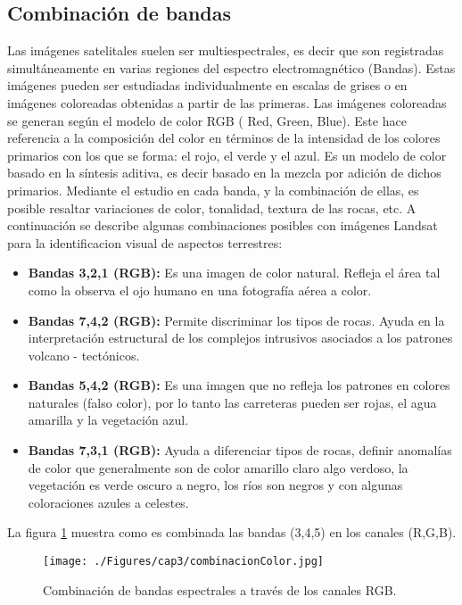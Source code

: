 \subsection{Combinaci\'on de bandas}
Las im\'agenes satelitales suelen ser multiespectrales, es decir que son registradas simult\'aneamente en varias regiones del espectro electromagn\'etico (Bandas). Estas im\'agenes pueden ser estudiadas individualmente en escalas de grises o en im\'agenes coloreadas obtenidas a partir de las primeras. Las im\'agenes coloreadas se generan seg\'un el modelo de color RGB ( Red, Green, Blue). Este hace referencia a la composici\'on del color en t\'erminos de la intensidad de los colores primarios con los que se forma: el rojo, el verde y el azul. Es un modelo de color basado en la s\'intesis aditiva, es decir basado en la mezcla por adici\'on de dichos primarios\cite{teledet2015Combi}.
Mediante el estudio en cada banda, y la combinaci\'on de ellas, es posible resaltar variaciones de color, tonalidad, textura de las rocas, etc. A continuaci\'on se describe algunas combinaciones posibles con im\'agenes Landsat para la identificacion visual de aspectos terrestres\cite{lillesand2014remote}:
	\begin{itemize}
		\item \textbf{Bandas 3,2,1 (RGB):} Es una imagen de color natural. Refleja el \'area tal como la observa el ojo humano en una fotograf\'ia a\'erea a color.
		\item  \textbf{Bandas 7,4,2 (RGB):} Permite discriminar los tipos de rocas. Ayuda en la interpretaci\'on estructural de los complejos intrusivos asociados a los patrones volcano - tect\'onicos.
		\item  \textbf{Bandas 5,4,2 (RGB):} Es una imagen que no refleja los patrones en colores naturales (falso color), por lo tanto las carreteras pueden ser rojas, el agua amarilla y la vegetaci\'on azul.
		\item \textbf{Bandas 7,3,1 (RGB):} Ayuda a diferenciar tipos de rocas, definir anomal\'ias de color que generalmente son de color amarillo claro algo verdoso, la vegetaci\'on es verde oscuro a negro, los r\'ios son negros y con algunas coloraciones azules a celestes.		
	\end{itemize}
 La figura \ref{fig:combinacionColor} muestra como es combinada las bandas (3,4,5) en los canales (R,G,B).
  \begin{figure}[H]
  	\centering
  	\texttt{[image: ./Figures/cap3/combinacionColor.jpg]}
  	\caption{Combinaci\'on de bandas espectrales a trav\'es de los canales RGB.}
  	\label{fig:combinacionColor}
  \end{figure}

